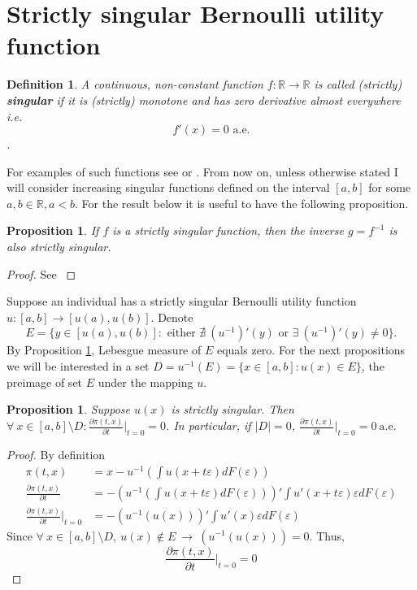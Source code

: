 \documentclass[a4paper]{article}
\newtheorem{proposition}[theorem]{Proposition}
\newtheorem{definition}[theorem]{Definition}
\begin{document}
\section{Strictly singular Bernoulli utility function}\label{Bsingular}
\begin{definition}
	A continuous, non-constant function $f:\mathbb{R} \to \mathbb{R}$ is called (strictly) \textbf{singular} if it is (strictly) monotone and has zero derivative almost everywhere i.e. $$f'(x) = 0 \text{ a.e.}$$.
\end{definition}
For examples of such functions see \cite{salem1943some} or \cite{berg2000rham}.
From now on, unless otherwise stated I will consider increasing singular functions defined on the interval $[a, b]$ for some $a, b \in \mathbb{R}, a<b$. For the result below it is useful to have the following proposition.
\begin{proposition}\label{inverse}
	If $f$ is a strictly singular function, then the inverse $g = f^{-1}$ is 
	also strictly singular.
\end{proposition}
\begin{proof}
	See \cite{berg2000rham}
\end{proof}
Suppose an individual has a strictly singular Bernoulli utility function $u: [a, b] \to [u(a), u(b)]$. Denote $$E = \{ y \in [u(a), u(b)]: \text{ either } \nexists\ (u^{-1})'(y) \text{ or }\exists\ (u^{-1})'(y) \neq 0 \}.$$ By Proposition \ref{inverse}, Lebesgue measure of $E$ equals zero. For the next propositions we will be interested in a set $D = u^{-1}(E) = \{x\in[a, b]: u(x) \in E\}$, the preimage of set $E$ under the mapping $u$.
\begin{proposition}\label{pi}
	Suppose $u(x)$ is strictly singular. Then $\forall\ x \in [a, b]\setminus D: \frac{\partial \pi (t, x)}{\partial t} \bigg|_{t=0} = 0$. In particular, if $|D| = 0$, $\frac{\partial \pi (t, x)}{\partial t} \bigg|_{t=0} = 0\ \text{a.e.}$
\end{proposition}
\begin{proof}
	By definition
	\begin{align*}
		\pi(t, x) &= x - u^{-1}\left( \int u(x + t \varepsilon) dF(\varepsilon) \right)\\
		\frac{\partial \pi(t, x)}{\partial t} &= -\left(u^{-1}\left( \int u(x + t \varepsilon) dF(\varepsilon) \right) \right)' \int u'(x+t \varepsilon)\varepsilon dF(\varepsilon)\\
		\frac{\partial \pi(t, x)}{\partial t} \bigg|_{t=0} &= -\left(u^{-1}\left( u(x) \right) \right)' \int u'(x)\varepsilon dF(\varepsilon)
	\end{align*}
Since $\forall\ x \in [a, b]\setminus D,\ u(x) \notin E\ \to\ (u^{-1}(u(x))) = 0$.
 Thus, $$\frac{\partial \pi(t, x)}{\partial t}\bigg|_{t = 0} = 0$$
\end{proof}
\end{document}
